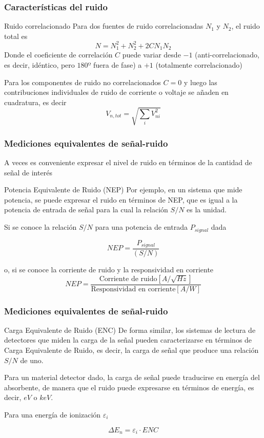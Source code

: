 \documentclass{beamer}
\begin{document}
\begin{frame}
\frametitle{Características del ruido}
\begin{block}{Ruido correlacionado}
Para dos fuentes de ruido correlacionadas $N_1$ y $N_2$, el ruido total es
$$N = N_1^2 + N_2^2 + 2CN_1N_2$$
Donde el coeficiente de correlación $C$ puede variar desde \alert{$-1$} (anti-correlacionado, 
es decir, idéntico, pero $180º$ fuera de fase) a \alert{$+1$} (totalmente correlacionado)

\vspace{2mm}
Para los componentes de ruido no correlacionados $C = 0$ y luego las contribuciones 
individuales de ruido de corriente o voltaje se añaden en cuadratura, es decir
$$V_{n,tot} = \sqrt{\sum_i V_{ni}^2}$$
\end{block}
\end{frame} 

\begin{frame}
\frametitle{Mediciones equivalentes de señal-ruido}
A veces es conveniente expresar el nivel de ruido en términos de la cantidad de
señal de interés
\begin{block}{Potencia Equivalente de Ruido (NEP)}
Por ejemplo, en un sistema que mide potencia, se puede expresar el ruido en
términos de NEP, que es igual a \alert{la potencia de entrada de señal para la cual la
relación $S/N$ es la unidad}.

Si se conoce la relación $S/N$ para una potencia de entrada $P_{signal}$ dada

$$NEP = \frac{P_{signal}}{(S/N)}$$

o, si se conoce la corriente de ruido y la responsividad en corriente
$$NEP = \frac{\text{Corriente de ruido}[A/\sqrt{Hz}]}{\text{Responsividad en
corriente}[A/W]}$$
\end{block}
\end{frame} 

\begin{frame}
\frametitle{Mediciones equivalentes de señal-ruido}
\begin{block}{Carga Equivalente de Ruido (ENC)}
De forma similar, los sistemas de lectura de detectores que miden la carga de la
señal pueden caracterizarse en términos de Carga Equivalente de Ruido, es decir,
\alert{la carga de señal que produce una relación $S/N$ de uno}.

Para un material detector dado, la carga de señal puede traducirse en energía
del absorbente, de manera que el ruido puede expresarse en términos de energía,
es decir, $eV$ o $keV$.

Para una energía de ionización $\varepsilon_i$

$$\Delta E_n = \varepsilon_i \cdot ENC$$

\end{block}
\end{frame} 
\end{document}
